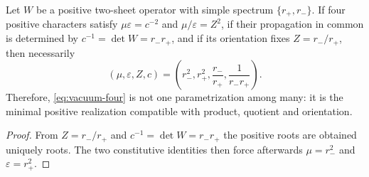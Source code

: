 \begin{proposition}
Let \(W\) be a positive two-sheet operator with simple spectrum
\(\{r_+,r_-\}\). If four positive characters satisfy
\(\mu\varepsilon=c^{-2}\) and \(\mu/\varepsilon=Z^2\), if their propagation in common is determined by \(c^{-1}=\det W=r_-r_+\), and if its orientation
fixes \(Z=r_-/r_+\), then necessarily
\[
(\mu,\varepsilon,Z,c)
=\left(r_-^2,r_+^2,\frac{r_-}{r_+},\frac1{r_-r_+}\right).
\]
Therefore, \cref{eq:vacuum-four} is not one parametrization among many:
it is the minimal positive realization compatible with product, quotient and
orientation.
\end{proposition}

\begin{proof}
From \(Z=r_-/r_+\) and \(c^{-1}=\det W=r_-r_+\) the positive roots are obtained uniquely
roots. The two constitutive identities then force afterwards
\(\mu=r_-^2\) and \(\varepsilon=r_+^2\).
\end{proof}

